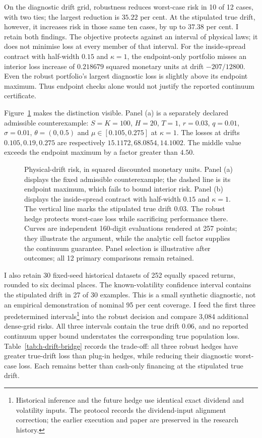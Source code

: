 \documentclass[11pt]{article}
\begin{document}
On the diagnostic drift grid, robustness reduces worst-case risk in
10 of 12 cases, with two ties; the largest reduction is $35.22$ per cent.
At the stipulated true drift, however, it increases risk in those same ten
cases, by up to $37.38$ per cent. I retain both findings. The objective
protects against an interval of physical laws; it does not minimise loss
at every member of that interval. For the inside-spread contract with
half-width $0.15$ and $\kappa=1$, the endpoint-only portfolio misses an
interior loss increase of $0.218679$ squared monetary units at drift
$-207/12800$. Even the robust portfolio's largest diagnostic loss is
slightly above its endpoint maximum. Thus endpoint checks alone would
not justify the reported continuum certificate.

Figure~\ref{fig:h-drift-robustness} makes the distinction visible.
Panel (a) is a separately declared admissible counterexample:
$S=K=100$, $H=20$, $T=1$, $r=0.03$, $q=0.01$, $\sigma=0.01$,
$\theta=(0,0.5)$ and $\mu\in[0.105,0.275]$ at $\kappa=1$.
The losses at drifts $0.105,0.19,0.275$ are respectively
$15.1172,68.0854,14.1002$. The middle value exceeds the endpoint
maximum by a factor greater than $4.50$.

\begin{figure}[tb]
\centering

\caption{Physical-drift risk, in squared discounted monetary units.
Panel (a) displays the fixed admissible counterexample; the dashed line
is its endpoint maximum, which fails to bound interior risk.
Panel (b) displays the inside-spread contract with half-width $0.15$
and $\kappa=1$. The vertical line marks the stipulated true drift $0.03$.
The robust hedge protects worst-case loss while sacrificing performance
there. Curves are independent 160-digit evaluations rendered at 257 points;
they illustrate the argument, while the analytic cell factor supplies
the continuum guarantee. Panel selection is illustrative after outcomes;
all 12 primary comparisons remain retained.}
\label{fig:h-drift-robustness}
\end{figure}

I also retain 30 fixed-seed historical datasets of 252 equally spaced
returns, rounded to six decimal places. The known-volatility confidence
interval contains the stipulated drift in 27 of 30 examples. This is a
small synthetic diagnostic, not an empirical demonstration of nominal
95 per cent coverage. I feed the first three predetermined intervals\footnote{Historical
inference and the future hedge use identical exact dividend and volatility
inputs. The protocol records the dividend-input alignment correction;
the earlier execution and paper are preserved in the research history.}
into the robust decision and compare 3,084 additional dense-grid risks.
All three intervals contain the true drift $0.06$, and no reported
continuum upper bound understates the corresponding true population loss.
Table~\ref{tab:h-drift-bridge} records the trade-off: all three robust
hedges have greater true-drift loss than plug-in hedges, while reducing
their diagnostic worst-case loss. Each remains better than cash-only
financing at the stipulated true drift.
\end{document}
